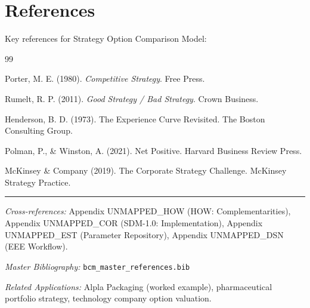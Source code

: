 \section{References}
\label{sec:socm-references}

Key references for Strategy Option Comparison Model:

\nocite{bcm_master}

\begin{thebibliography}{99}

 Porter, M. E. (1980). \textit{Competitive Strategy}. Free Press.

 Rumelt, R. P. (2011). \textit{Good Strategy / Bad Strategy}. Crown Business.

 Henderson, B. D. (1973). The Experience Curve Revisited. The Boston Consulting Group.

 Polman, P., \& Winston, A. (2021). Net Positive. Harvard Business Review Press.

 McKinsey \& Company (2019). The Corporate Strategy Challenge. McKinsey Strategy Practice.

\end{thebibliography}


\vspace{1em}
\hrule
\vspace{0.5em}

\noindent\textit{Cross-references:}
Appendix UNMAPPED_HOW (HOW: Complementarities),
Appendix UNMAPPED_COR (SDM-1.0: Implementation),
Appendix UNMAPPED_EST (Parameter Repository),
Appendix UNMAPPED_DSN (EEE Workflow).

\noindent\textit{Master Bibliography:} \texttt{bcm\_master\_references.bib}

\noindent\textit{Related Applications:} Alpla Packaging (worked example), pharmaceutical portfolio strategy, technology company option valuation.

